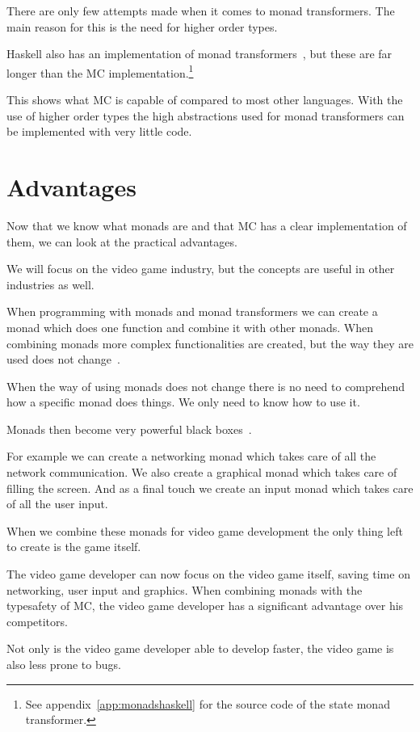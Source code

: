 There are only few attempts made when it comes to monad transformers.
The main reason for this is the need for higher order types.

Haskell also has an implementation of monad transformers~\cite{haskelllibrary}, but these are far longer than the MC implementation.\footnote{See appendix~\ref{app:monadshaskell} for the source code of the state monad transformer.}

This shows what MC is capable of compared to most other languages.
With the use of higher order types the high abstractions used for monad transformers can be implemented with very little code.


\section{Advantages}
Now that we know what monads are and that MC has a clear implementation of them, we can look at the practical advantages.

We will focus on the video game industry, but the concepts are useful in other industries as well.

When programming with monads and monad transformers we can create a monad which does one function and combine it with other monads.
When combining monads more complex functionalities are created, but the way they are used does not change~\cite{liang1995monad,swierstra2008data}.

When the way of using monads does not change there is no need to comprehend how a specific monad does things.
We only need to know how to use it.

Monads then become very powerful black boxes~\cite{liang1995monad,wadler1995monads,swierstra2008data}.

For example we can create a networking monad which takes care of all the network communication.
We also create a graphical monad which takes care of filling the screen.
And as a final touch we create an input monad which takes care of all the user input.

When we combine these monads for video game development the only thing left to create is the game itself.

The video game developer can now focus on the video game itself, saving time on networking, user input and graphics.
When combining monads with the typesafety of MC, the video game developer has a significant advantage over his competitors.

Not only is the video game developer able to develop faster, the video game is also less prone to bugs.



